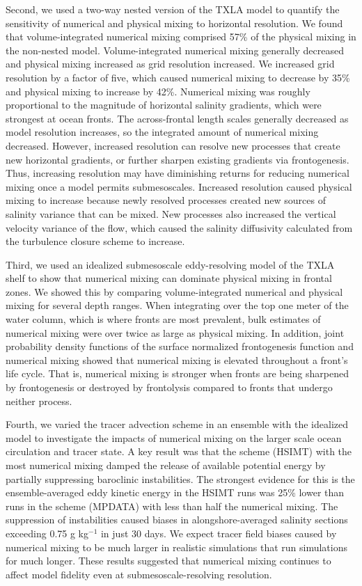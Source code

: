 Second, we used a two-way nested version of the TXLA model to quantify the sensitivity of numerical and physical mixing to horizontal resolution. We found that volume-integrated numerical mixing comprised 57\% of the physical mixing in the non-nested model. Volume-integrated numerical mixing generally decreased and physical mixing increased as grid resolution increased. We increased grid resolution by a factor of five, which caused numerical mixing to decrease by 35\% and physical mixing to increase by 42\%. Numerical mixing was roughly proportional to the magnitude of horizontal salinity gradients, which were strongest at ocean fronts. The across-frontal length scales generally decreased as model resolution increases, so the integrated amount of numerical mixing decreased. However, increased resolution can resolve new processes that create new horizontal gradients, or further sharpen existing gradients via frontogenesis. Thus, increasing resolution may have diminishing returns for reducing numerical mixing once a model permits submesoscales. Increased resolution caused physical mixing to increase because newly resolved processes created new sources of salinity variance that can be mixed. New processes also increased the vertical velocity variance of the flow, which caused the salinity diffusivity calculated from the turbulence closure scheme to increase. 

Third, we used an idealized submesoscale eddy-resolving model of the TXLA shelf to show that numerical mixing can dominate physical mixing in frontal zones. We showed this by comparing volume-integrated numerical and physical mixing for several depth ranges. When integrating over the top one meter of the water column, which is where fronts are most prevalent, bulk estimates of numerical mixing were over twice as large as physical mixing. In addition, joint probability density functions of the surface normalized frontogenesis function and numerical mixing showed that numerical mixing is elevated throughout a front's life cycle. That is, numerical mixing is stronger when fronts are being sharpened by frontogenesis or destroyed by frontolysis compared to fronts that undergo neither process. 

Fourth, we varied the tracer advection scheme in an ensemble with the idealized model to investigate the impacts of numerical mixing on the larger scale ocean circulation and tracer state. A key result was that the scheme (HSIMT) with the most numerical mixing damped the release of available potential energy by partially suppressing baroclinic instabilities. The strongest evidence for this is the ensemble-averaged eddy kinetic energy in the HSIMT runs was 25\% lower than runs in the scheme (MPDATA) with less than half the numerical mixing. The suppression of instabilities caused biases in alongshore-averaged salinity sections exceeding 0.75 g kg$^{-1}$ in just 30 days. We expect tracer field biases caused by numerical mixing to be much larger in realistic simulations that run simulations for much longer. These results suggested that numerical mixing continues to affect model fidelity even at submesoscale-resolving resolution. 

